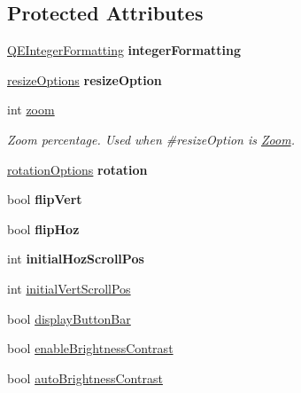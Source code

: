 \subsection*{Protected Attributes}
\begin{DoxyCompactItemize}
\item 
\hypertarget{classQEImage_a78b396dc57630269a3615af82a4d9314}{
\hyperlink{classQEIntegerFormatting}{QEIntegerFormatting} {\bfseries integerFormatting}}
\label{classQEImage_a78b396dc57630269a3615af82a4d9314}

\item 
\hypertarget{classQEImage_a46696985febb2f880707a96e51366d33}{
\hyperlink{classQEImage_ab70b57397dad6bbe6e659f9831a481dd}{resizeOptions} {\bfseries resizeOption}}
\label{classQEImage_a46696985febb2f880707a96e51366d33}

\item 
\hypertarget{classQEImage_acc75dbfecaa2e75d9bcf7c11384f3465}{
int \hyperlink{classQEImage_acc75dbfecaa2e75d9bcf7c11384f3465}{zoom}}
\label{classQEImage_acc75dbfecaa2e75d9bcf7c11384f3465}

\begin{DoxyCompactList}\small\item\em Zoom percentage. Used when \#resizeOption is \hyperlink{classQEImage_af9f3e6c8c2bbadf453a2354e7b14c615ae2430964584e02ae5f9a6cab8f1a5c26}{Zoom}. \end{DoxyCompactList}\item 
\hypertarget{classQEImage_ae2be9727fbd6cf4039fe8a9a6b9e71ee}{
\hyperlink{classQEImage_af3827d9fcef5cb397ac947e48558208a}{rotationOptions} {\bfseries rotation}}
\label{classQEImage_ae2be9727fbd6cf4039fe8a9a6b9e71ee}

\item 
\hypertarget{classQEImage_a4e552727c2b7a8805617da0b5d74fa4a}{
bool {\bfseries flipVert}}
\label{classQEImage_a4e552727c2b7a8805617da0b5d74fa4a}

\item 
\hypertarget{classQEImage_a5c270c341a4bea5e5cfc8ce19d476732}{
bool {\bfseries flipHoz}}
\label{classQEImage_a5c270c341a4bea5e5cfc8ce19d476732}

\item 
\hypertarget{classQEImage_a67baf16ff2d79e6e596e580f30ec80cd}{
int {\bfseries initialHozScrollPos}}
\label{classQEImage_a67baf16ff2d79e6e596e580f30ec80cd}

\item 
int \hyperlink{classQEImage_af4af8618263670a539f5f42f69378256}{initialVertScrollPos}
\item 
bool \hyperlink{classQEImage_a5d25b289ae57a8848e13816c62def90a}{displayButtonBar}
\item 
bool \hyperlink{classQEImage_a8d593efab178653a7275b78e22da4fdf}{enableBrightnessContrast}
\item 
bool \hyperlink{classQEImage_a628f5be86f9bc38c167f21d740f7b86e}{autoBrightnessContrast}
\end{DoxyCompactItemize}
